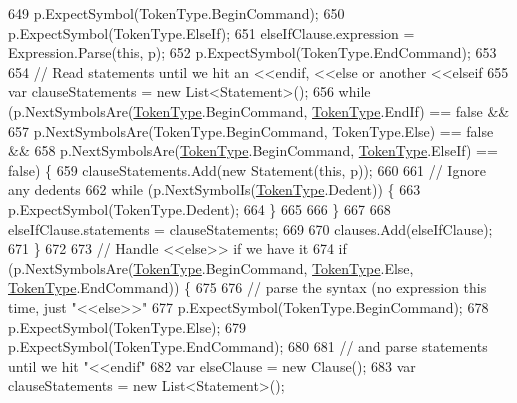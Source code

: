 \begin{DoxyCode}
649                     p.ExpectSymbol(TokenType.BeginCommand);
650                     p.ExpectSymbol(TokenType.ElseIf);
651                     elseIfClause.expression = Expression.Parse(\textcolor{keyword}{this}, p);
652                     p.ExpectSymbol(TokenType.EndCommand);
653 
654                     \textcolor{comment}{// Read statements until we hit an <<endif, <<else or another <<elseif}
655                     var clauseStatements = \textcolor{keyword}{new} List<Statement>();
656                     \textcolor{keywordflow}{while} (p.NextSymbolsAre(\hyperlink{a00031_a301aa7c866593a5b625a8fc158bbeace}{TokenType}.BeginCommand, 
      \hyperlink{a00031_a301aa7c866593a5b625a8fc158bbeace}{TokenType}.EndIf) == \textcolor{keyword}{false} &&
657                         p.NextSymbolsAre(TokenType.BeginCommand, TokenType.Else) == \textcolor{keyword}{false} &&
658                         p.NextSymbolsAre(\hyperlink{a00031_a301aa7c866593a5b625a8fc158bbeace}{TokenType}.BeginCommand, 
      \hyperlink{a00031_a301aa7c866593a5b625a8fc158bbeace}{TokenType}.ElseIf) == \textcolor{keyword}{false}) \{
659                         clauseStatements.Add(\textcolor{keyword}{new} Statement(\textcolor{keyword}{this}, p));
660 
661                         \textcolor{comment}{// Ignore any dedents}
662                         \textcolor{keywordflow}{while} (p.NextSymbolIs(\hyperlink{a00031_a301aa7c866593a5b625a8fc158bbeace}{TokenType}.Dedent)) \{
663                             p.ExpectSymbol(TokenType.Dedent);
664                         \}
665 
666                     \}
667 
668                     elseIfClause.statements = clauseStatements;
669 
670                     clauses.Add(elseIfClause);
671                 \}
672 
673                 \textcolor{comment}{// Handle <<else>> if we have it}
674                 \textcolor{keywordflow}{if} (p.NextSymbolsAre(\hyperlink{a00031_a301aa7c866593a5b625a8fc158bbeace}{TokenType}.BeginCommand, \hyperlink{a00031_a301aa7c866593a5b625a8fc158bbeace}{TokenType}.Else, 
      \hyperlink{a00031_a301aa7c866593a5b625a8fc158bbeace}{TokenType}.EndCommand)) \{
675 
676                     \textcolor{comment}{// parse the syntax (no expression this time, just "<<else>>"}
677                     p.ExpectSymbol(TokenType.BeginCommand);
678                     p.ExpectSymbol(TokenType.Else);
679                     p.ExpectSymbol(TokenType.EndCommand);
680 
681                     \textcolor{comment}{// and parse statements until we hit "<<endif"}
682                     var elseClause = \textcolor{keyword}{new} Clause();
683                     var clauseStatements = \textcolor{keyword}{new} List<Statement>();

\end{DoxyCode}
